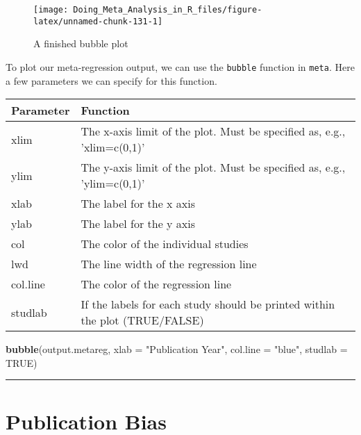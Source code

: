 \documentclass[]{book}
\newenvironment{Shaded}{\begin{snugshade}}{\end{snugshade}}
\newcommand{\KeywordTok}[1]{\textcolor[rgb]{0.13,0.29,0.53}{\textbf{#1}}}
\newcommand{\DataTypeTok}[1]{\textcolor[rgb]{0.13,0.29,0.53}{#1}}
\newcommand{\StringTok}[1]{\textcolor[rgb]{0.31,0.60,0.02}{#1}}
\newcommand{\OtherTok}[1]{\textcolor[rgb]{0.56,0.35,0.01}{#1}}
\newcommand{\NormalTok}[1]{#1}
\theoremstyle{definition}
\theoremstyle{definition}
\theoremstyle{definition}
\theoremstyle{remark}
\begin{document}
\begin{figure}

{\centering \texttt{[image: Doing\_Meta\_Analysis\_in\_R\_files/figure-latex/unnamed-chunk-131-1]} 

}

\caption{A finished bubble plot}\label{fig:unnamed-chunk-131}
\end{figure}

To plot our meta-regression output, we can use the \texttt{bubble}
function in \texttt{meta}. Here a few parameters we can specify for this
function.

\begin{tabular}{l|l}
\hline
Parameter & Function\\
\hline
xlim & The x-axis limit of the plot. Must be specified as, e.g., 'xlim=c(0,1)'\\
\hline
ylim & The y-axis limit of the plot. Must be specified as, e.g., 'ylim=c(0,1)'\\
\hline
xlab & The label for the x axis\\
\hline
ylab & The label for the y axis\\
\hline
col & The color of the individual studies\\
\hline
lwd & The line width of the regression line\\
\hline
col.line & The color of the regression line\\
\hline
studlab & If the labels for each study should be printed within the plot (TRUE/FALSE)\\
\hline
\end{tabular}

\begin{Shaded}
\begin{Highlighting}[]
\KeywordTok{bubble}\NormalTok{(output.metareg,}
       \DataTypeTok{xlab =} \StringTok{"Publication Year"}\NormalTok{,}
       \DataTypeTok{col.line =} \StringTok{"blue"}\NormalTok{,}
       \DataTypeTok{studlab =} \OtherTok{TRUE}\NormalTok{)}
\end{Highlighting}
\end{Shaded}

\begin{center}\rule{0.5\linewidth}{\linethickness}\end{center}

\chapter{Publication Bias}\label{publication-bias}
\end{document}
